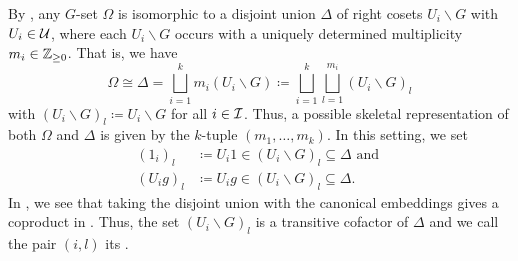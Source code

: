 \begin{rem}
By , any $G$-set $\Omega$ is isomorphic to a disjoint union $\Delta$ of right cosets $U_i \backslash G$ with $U_i \in \mathcal{U}$, where each $U_i \backslash G$ occurs with a uniquely determined multiplicity $m_i \in \mathbb{Z}_{\geq 0}$. That is, we have \[\Omega \cong \Delta = \bigsqcup_{i=1}^k m_i (U_i \backslash G) \coloneqq \bigsqcup_{i=1}^k \bigsqcup_{l=1}^{m_i} (U_i \backslash G)_l\] with $(U_i \backslash G)_l \coloneqq U_i \backslash G$ for all $i \in \mathcal{I}$. Thus, a possible skeletal representation of both $\Omega$ and $\Delta$ is given by the $k$-tuple $(m_1,\dots,m_k)$. In this setting, we set
\begin{align*}
(1_i)_l &\coloneqq U_i1 \in (U_i \backslash G)_l \subseteq \Delta\text{ and }\\
(U_ig)_l &\coloneqq U_ig \in (U_i \backslash G)_l \subseteq \Delta.
\end{align*}
In \cite{Julia}, we see that taking the disjoint union with the canonical embeddings gives a coproduct in \Gset{}. Thus, the set $(U_i \backslash G)_l$ is a transitive cofactor of $\Delta$ and we call the pair $(i,l)$ its .
\end{rem}

